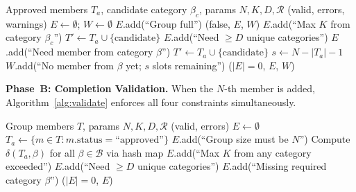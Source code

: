 \documentclass[11pt,a4paper]{article}
\theoremstyle{plain}
\theoremstyle{definition}
\begin{document}
\begin{algorithm}[htbp]
\caption{Pre-Addition Constraint Validation (\texttt{canAddMember})}
\label{alg:canAdd}
\small
\begin{algorithmic}[1]
\REQUIRE Approved members $T_a$, candidate category $\beta_c$, params $N, K, D, \mathcal{R}$
\ENSURE (valid, errors, warnings)
\STATE $E \gets \emptyset$; $W \gets \emptyset$
    \STATE $E$.add(``Group full'')
    \RETURN (false, $E$, $W$)
\ENDIF
{}
    \STATE $E$.add(``Max $K$ from category $\beta_c$'')
\ENDIF
{}
    \STATE {}
    \STATE $T' \gets T_a \cup \{\text{candidate}\}$
        \STATE $E$.add(``Need $\geq D$ unique categories'')
    \ENDIF
            \STATE $E$.add(``Need member from category $\beta$'')
        \ENDIF
    \ENDFOR
{}
    \STATE $T' \gets T_a \cup \{\text{candidate}\}$
            \STATE $s \gets N - |T_a| - 1$
            \STATE $W$.add(``No member from $\beta$ yet; $s$ slots remaining'')
        \ENDIF
    \ENDFOR
\ENDIF
\RETURN ($|E| = 0$, $E$, $W$)
\end{algorithmic}
\end{algorithm}

\textbf{Phase~B: Completion Validation.} When the $N$-th member is added, Algorithm~\ref{alg:validate} enforces all four constraints simultaneously.

\begin{algorithm}[htbp]
\caption{Full Group Composition Validation (\texttt{validateComposition})}
\label{alg:validate}
\small
\begin{algorithmic}[1]
\REQUIRE Group members $T$, params $N, K, D, \mathcal{R}$
\ENSURE (valid, errors)
\STATE $E \gets \emptyset$
\STATE $T_a \gets \{m \in T : m.\text{status} = \text{``approved''}\}$
    \STATE $E$.add(``Group size must be $N$'')
\ENDIF
\STATE Compute $\delta(T_a, \beta)$ for all $\beta \in \mathcal{B}$ via hash map
    \STATE $E$.add(``Max $K$ from any category exceeded'')
\ENDIF
{}
    \STATE $E$.add(``Need $\geq D$ unique categories'')
\ENDIF
{}
        \STATE $E$.add(``Missing required category $\beta$'')
    \ENDIF
\ENDFOR
\RETURN ($|E| = 0$, $E$)
\end{algorithmic}
\end{algorithm}
\end{document}
